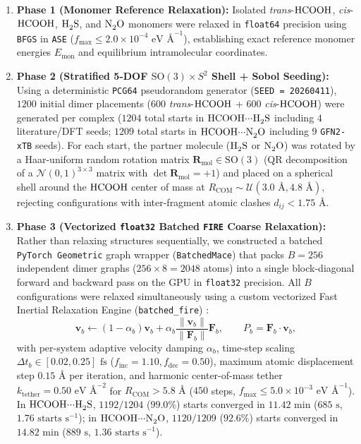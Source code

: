 \documentclass[journal=jpclcd,manuscript=article]{achemso}
\begin{document}
\begin{enumerate}
  \item \textbf{Phase 1 (Monomer Reference Relaxation):} Isolated \textit{trans}-$\ce{HCOOH}$, \textit{cis}-$\ce{HCOOH}$, $\ce{H2S}$, and $\ce{N2O}$ monomers were relaxed in \texttt{float64} precision using \texttt{BFGS} in \texttt{ASE} \cite{Larsen2017} ($f_{\max} \le 2.0\times 10^{-4}\text{ eV \AA}^{-1}$), establishing exact reference monomer energies $E_{\mathrm{mon}}$ and equilibrium intramolecular coordinates.
  \item \textbf{Phase 2 (Stratified 5-DOF $\mathrm{SO}(3)\times S^2$ Shell + Sobol Seeding):} Using a deterministic \texttt{PCG64} pseudorandom generator (\texttt{SEED = 20260411}), $1200$ initial dimer placements ($600$ \textit{trans}-$\ce{HCOOH}$ + $600$ \textit{cis}-$\ce{HCOOH}$) were generated per complex ($1204$ total starts in $\ce{HCOOH\bond{...}H2S}$ including $4$ literature/DFT seeds; $1209$ total starts in $\ce{HCOOH\bond{...}N2O}$ including $9$ \texttt{GFN2-xTB} seeds). For each start, the partner molecule ($\ce{H2S}$ or $\ce{N2O}$) was rotated by a Haar-uniform random rotation matrix $\mathbf{R}_{\mathrm{mol}} \in \mathrm{SO}(3)$ (QR decomposition of a $\mathcal{N}(0,1)^{3\times 3}$ matrix with $\det\mathbf{R}_{\mathrm{mol}} = +1$) and placed on a spherical shell around the $\ce{HCOOH}$ center of mass at $R_{\mathrm{COM}} \sim \mathcal{U}(3.0\text{ \AA}, 4.8\text{ \AA})$, rejecting configurations with inter-fragment atomic clashes $d_{ij} < 1.75\text{ \AA}$.
  \item \textbf{Phase 3 (Vectorized \texttt{float32} Batched \texttt{FIRE} Coarse Relaxation):} Rather than relaxing structures sequentially, we constructed a batched \texttt{PyTorch Geometric} graph wrapper (\texttt{BatchedMace}) that packs $B = 256$ independent dimer graphs ($256\times 8 = 2048$ atoms) into a single block-diagonal forward and backward pass on the GPU in \texttt{float32} precision. All $B$ configurations were relaxed simultaneously using a custom vectorized Fast Inertial Relaxation Engine (\texttt{batched\_fire}) \cite{Bitzek2006}:
  \begin{equation}
    \mathbf{v}_b \leftarrow (1 - \alpha_b)\mathbf{v}_b + \alpha_b \frac{\|\mathbf{v}_b\|}{\|\mathbf{F}_b\|}\mathbf{F}_b, \qquad P_b = \mathbf{F}_b \cdot \mathbf{v}_b,
  \end{equation}
  with per-system adaptive velocity damping $\alpha_b$, time-step scaling $\Delta t_b \in [0.02, 0.25]\text{ fs}$ ($f_{\mathrm{inc}} = 1.10, f_{\mathrm{dec}} = 0.50$), maximum atomic displacement step $0.15\text{ \AA}$ per iteration, and harmonic center-of-mass tether $k_{\mathrm{tether}} = 0.50\text{ eV \AA}^{-2}$ for $R_{\mathrm{COM}} > 5.8\text{ \AA}$ ($450$ steps, $f_{\max} \le 5.0\times 10^{-3}\text{ eV \AA}^{-1}$). In $\ce{HCOOH\bond{...}H2S}$, $1192/1204$ ($99.0\%$) starts converged in $11.42\text{ min}$ ($685\text{ s}$, $1.76\text{ starts s}^{-1}$); in $\ce{HCOOH\bond{...}N2O}$, $1120/1209$ ($92.6\%$) starts converged in $14.82\text{ min}$ ($889\text{ s}$, $1.36\text{ starts s}^{-1}$).

\end{enumerate}
\end{document}
